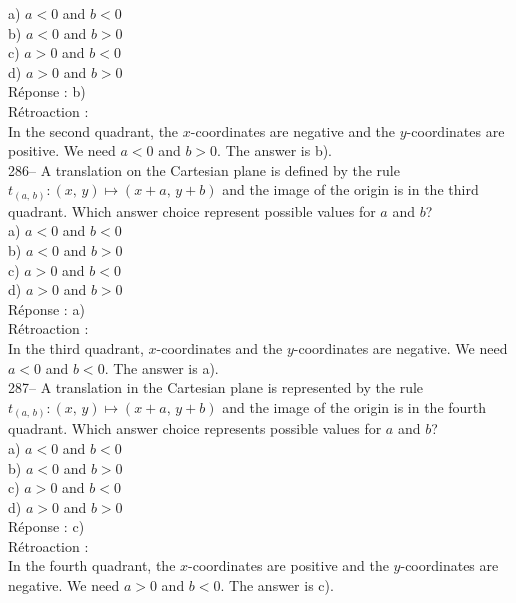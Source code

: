 \documentclass[letterpaper, 12pt]{article}
\begin{document}
a) $a<0$ and $b<0$\\
b) $a<0$ and $b>0$\\
c) $a>0$ and $b<0$\\
d) $a>0$ and $b>0$\\

R\'eponse : b)\\

R\'etroaction : \\
In the second quadrant, the $x$-coordinates are negative and the
$y$-coordinates are positive. We need $a<0$ and $b>0$. The answer is
b).\\

286-- A translation on the Cartesian plane is defined by the rule
$t_{\left( a,\,b\right) } :\left(x,\,y\right)\longmapsto
\left(x+a,\,y+b\right) $ and the image of the origin is in the third
quadrant. Which answer choice represent possible values for $a$ and $b$?\\

a) $a<0$ and $b<0$\\
b) $a<0$ and $b>0$\\
c) $a>0$ and $b<0$\\
d) $a>0$ and $b>0$\\

R\'eponse : a)\\

R\'etroaction : \\
In the third quadrant, $x$-coordinates and the $y$-coordinates are
negative. We need $a<0$ and $b<0$. The answer is a).\\

287-- A translation in the Cartesian plane is represented by the
rule $t_{\left( a,\,b\right) } :\left(x,\,y\right)\longmapsto
\left(x+a,\,y+b\right) $ and the image of the origin is in the
fourth quadrant. Which answer choice represents possible values for
$a$ and $b$?\\

a) $a<0$ and $b<0$\\
b) $a<0$ and $b>0$\\
c) $a>0$ and $b<0$\\
d) $a>0$ and $b>0$\\

R\'eponse : c) \\

R\'etroaction : \\
In the fourth quadrant, the $x$-coordinates are positive and the
$y$-coordinates are negative. We need $a>0$ and $b<0$. The answer
is c).\\
\end{document}

